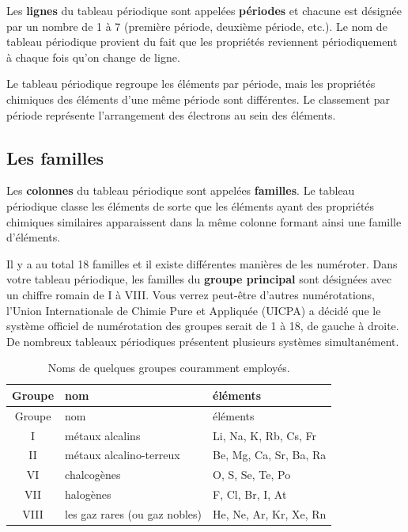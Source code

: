 \documentclass[
  11pt,
  a4paper,
  openany]{book}
\begin{document}
Les \textbf{lignes} du tableau périodique sont appelées \textbf{périodes} et chacune est désignée par un nombre de 1 à 7 (première période, deuxième période, etc.). Le nom de tableau périodique provient du fait que les propriétés reviennent périodiquement à chaque fois qu'on change de ligne.

Le tableau périodique regroupe les éléments par période, mais les propriétés chimiques des éléments d'une même période sont différentes. Le classement par période représente l'arrangement des électrons au sein des éléments.

\hypertarget{les-familles}{%
\subsection{Les familles}\label{les-familles}}

Les \textbf{colonnes} du tableau périodique sont appelées \textbf{familles}. Le tableau périodique classe les éléments de sorte que les éléments ayant des propriétés chimiques similaires apparaissent dans la même colonne formant ainsi une famille d'éléments.

Il y a au total 18 familles et il existe différentes manières de les numéroter. Dans votre tableau périodique, les familles du \textbf{groupe principal} sont désignées avec un chiffre romain de I à VIII. Vous verrez peut-être d'autres numérotations, l'Union Internationale de Chimie Pure et Appliquée (UICPA) a décidé que le système officiel de numérotation des groupes serait de 1 à 18, de gauche à droite. De nombreux tableaux périodiques présentent plusieurs systèmes simultanément.

\begin{longtable}[]{@{}cll@{}}
\caption{\label{tab:noms-groupes-courants} Noms de quelques groupes couramment employés.}\tabularnewline
\toprule()
Groupe & nom & éléments \\
\midrule()
\endfirsthead
\toprule()
Groupe & nom & éléments \\
\midrule()
\endhead
I & métaux alcalins & Li, Na, K, Rb, Cs, Fr \\
II & métaux alcalino-terreux & Be, Mg, Ca, Sr, Ba, Ra \\
VI & chalcogènes & O, S, Se, Te, Po \\
VII & halogènes & F, Cl, Br, I, At \\
VIII & les gaz rares (ou gaz nobles) & He, Ne, Ar, Kr, Xe, Rn \\
\bottomrule()
\end{longtable}
\end{document}
